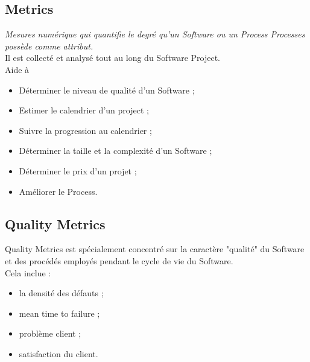 \subsection{Metrics}
\textit{Mesures numérique qui quantifie le degré qu'un Software ou un Process Processes possède comme attribut.}
\\Il est collecté et analysé tout au long du Software Project.
\\Aide à
\begin{itemize}
    \item Déterminer le niveau de qualité d'un Software ;
	\item Estimer le calendrier d'un project ;
	\item Suivre la progression au calendrier ;
	\item Déterminer la taille et la complexité d'un Software ;
	\item Déterminer le prix d'un projet ;
	\item Améliorer le Process.
\end{itemize}



\subsection{Quality Metrics}
Quality Metrics est spécialement concentré sur la caractère "qualité" du Software et des procédés employés pendant le cycle de vie du Software.
\\Cela inclue :
\begin{itemize}
	\item la densité des défauts ;
	\item mean time to failure ;
	\item problème client ;
	\item satisfaction du client.
\end{itemize}